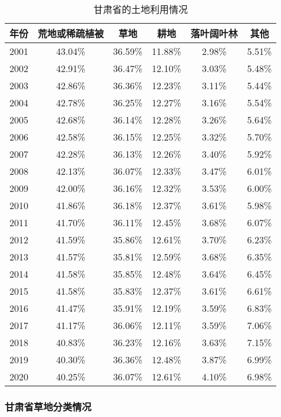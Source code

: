 \documentclass[AutoFakeBold]{LZUThesis-PgD&PhD}
\begin{document}
		\begin{table}[H]
			\centering
			\begin{tabular}{|c|c|c|c|c|c|}
				\hline
				年份 & 荒地或稀疏植被 & 草地 & 耕地 & 落叶阔叶林 & 其他 \\
				\hline
				2001 & 43.04\% & 36.59\% & 11.88\% & 2.98\% & 5.51\% \\
				2002 & 42.91\% & 36.47\% & 12.10\% & 3.03\% & 5.48\% \\
				2003 & 42.86\% & 36.36\% & 12.23\% & 3.11\% & 5.44\% \\
				2004 & 42.78\% & 36.25\% & 12.27\% & 3.16\% & 5.54\% \\
				2005 & 42.68\% & 36.14\% & 12.28\% & 3.26\% & 5.64\% \\
				2006 & 42.58\% & 36.15\% & 12.25\% & 3.32\% & 5.70\% \\
				2007 & 42.28\% & 36.13\% & 12.26\% & 3.40\% & 5.92\% \\
				2008 & 42.13\% & 36.07\% & 12.33\% & 3.47\% & 6.01\% \\
				2009 & 42.00\% & 36.16\% & 12.32\% & 3.53\% & 6.00\% \\
				2010 & 41.86\% & 36.18\% & 12.37\% & 3.61\% & 5.98\% \\
				2011 & 41.70\% & 36.11\% & 12.45\% & 3.68\% & 6.07\% \\
				2012 & 41.59\% & 35.86\% & 12.61\% & 3.70\% & 6.23\% \\
				2013 & 41.57\% & 35.81\% & 12.59\% & 3.68\% & 6.35\% \\
				2014 & 41.58\% & 35.85\% & 12.48\% & 3.64\% & 6.45\% \\
				2015 & 41.58\% & 35.83\% & 12.37\% & 3.61\% & 6.61\% \\
				2016 & 41.47\% & 35.91\% & 12.19\% & 3.59\% & 6.83\% \\
				2017 & 41.17\% & 36.06\% & 12.11\% & 3.59\% & 7.06\% \\
				2018 & 40.83\% & 36.23\% & 12.16\% & 3.63\% & 7.15\% \\
				2019 & 40.30\% & 36.36\% & 12.48\% & 3.87\% & 6.99\% \\
				2020 & 40.25\% & 36.07\% & 12.61\% & 4.10\% & 6.98\% \\
				\hline
			\end{tabular}
			\caption{甘肃省的土地利用情况}
		\end{table}



\subsubsection{甘肃省草地分类情况}
\end{document}
